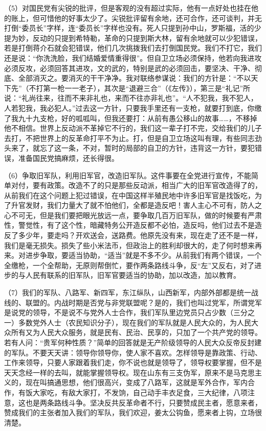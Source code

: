 （5）对国民党有尖锐的批评，但是客观的没有超过实际，他有一点好处也挂在他的账上，但可惜他的好事太少了。尖锐批评留有余地，还可合作，还可谈判，并无打倒“委员长”字样，连“委员长”字样也没有。死人只提到孙中山，罗斯福，活的少提为妙，反动的只提到希特勒，革命的只提到斯大林，留有余地就可以少犯错误，若是打倒蒋介石就会犯错误，他们几次挑拨我们去打倒国民党。我们不打它，我们还是说：“你洗洗脸，我们结婚爱情重得很”。但自卫立场必须保持，他若向我进攻必须反攻，必须回答其进攻，文的武的，特别是武的必须回击，要坚决、干净、彻底、全部消灭之。要消灭的干干净净。我对联络参谋说：我们的方针是：“不以天下先”（不打第一枪一一老子），其次是“退避三合”（《左传》），第三是“礼记”所说：“礼尚往来，往而不来非礼也，来而不往亦非礼也”。“人不犯我，我不犯人，人若犯我，我必犯人。”过去这一方针，只要我手里还有一支枪，就要打到底，你缴了我九十九支枪，好的呱呱叫，但我还要打：从前有愚公移山的故事……，不移掉他不相信。世界上反动派不革掉它不行的，我们这一辈子打不完，交给我们的儿子去打，不把世界上的反革命打平不为止。打，但是自卫立场这叫有理，有些同志劲头来了，就忘了这一条，不对，暂时的局部的自卫的方针，违背这一方针，要犯错误，准备国民党搞麻烦，还长得很。

（6）争取旧军队，利用旧军官，改造旧军队。这件事要在全党进行宣传，不能简单对付，要有政策。改造不了的只是那些反动派，相当广大的旧军官改造得了的，从前我们在这个问题上犯过错误，在中国这样半殖民地中许多旧军官是找饭吃，为了升官发财，我们力量大了就不怕他们，全都是造反吧！害人主心不可有，防人之心不可无，但是我们要把眼光放远一点，要争取几百万旧军队，做的时候要有严肃性，警觉性，有了这个性，暗藏特务公开造反都不必怕，造反吗，他们过去不是造反了多少年，要走吗？开欢送会，送路费。他原先没有来，现在走了还不是一样，我们是毫无损失。损失了些小米法币，但政治上的胜利却很大的，走了何时想来再来。对进步争取，要适当协助，“适当”就是不多不少。从前我们有两个错误，一个全缴枪，一个全帮助，无原则帮倒忙，要作两条路线斗争，反“左”又反右，对了进步的与人民有联系的旧军队，旧军官要适当的协助，加以改造，加以教育。

（7）我们的军队、八路军、新四军，东江纵队，山西新军，内部外部都是统一战线的、联盟的。内战时期是否党与非党联盟呢？是的，我们也叫过党军，所谓党军是说党的领导，不是说不与党外人士合作，我们军队里边党员只占少数（三分之一）多数党外人士（农民知识分子），现在我们的军队就是人民大众的，为人民大众所有又为人民大众服务，就是民有、民治、民享的，只加了一个共产党的领导。若有人问：“贵军何种性质？”简单的回答就是无产阶级领导的人民大众反帝反封建的军队。不要天天讲：领导你领导你，使人家不喜欢。怎样领导是靠政策、行动、工作来领导，只要人家跟着我们走，你不说也就是领导了，领导权要掌握，但不是天天念经一样的去叫，就能掌握领导权。现在山东有三支伪军，原来不是马克思主义的，现在叫搞通思想，他们很高兴，变成了八路军，这就是军外合作，军内合作，有饭大家吃，有敌大家打，不发饷，自己动手丰衣足食，三大纪律，八项注意，这也是两条路线斗争。坚决反共反革命者不行，只要赞成民主者，愿意来者，赞成我们的主张者加入我们的军队，我们欢迎，姜太公钩鱼，愿来者上钩，立场很清楚。

